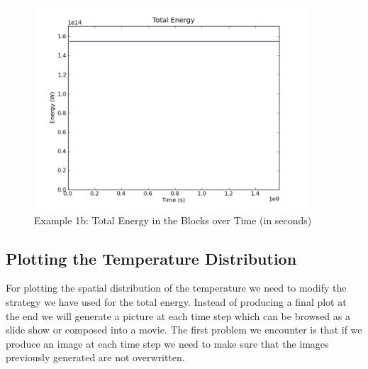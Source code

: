 \begin{figure}[ht]
\begin{center}
\includegraphics[width=4in]{figures/ttblockspyplot150}
\caption{Example 1b: Total Energy in the Blocks over Time (in seconds)}
\label{fig:onedheatout1} 
\end{center}
\end{figure}
\clearpage

\subsection{Plotting the Temperature Distribution}
\label{sec: plot T}
For plotting the spatial distribution of the temperature we need to modify the
strategy we have used for the total energy.
Instead of producing a final plot at the end we will generate a 
picture at each time step which can be browsed as a slide show or composed into
a movie.
The first problem we encounter is that if we produce an image at each time step
we need to make sure that the images previously generated are not overwritten.

